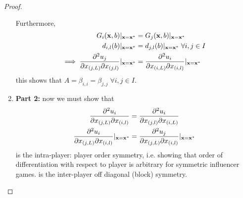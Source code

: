 \documentclass{article}
\begin{document}
\begin{proof}
\begin{enumerate}
                    
                    Furthermore,
                    \begin{align}
                        G_{i}(\mathbf{x},b)|_{\mathbf{x}=\mathbf{x}^*}&=G_{j}(\mathbf{x},b)|_{\mathbf{x}=\mathbf{x}^*}\ \\ %
                        d_{i,l}(b)|_{\mathbf{x}=\mathbf{x}^*}&= d_{j,l}(b)|_{\mathbf{x}=\mathbf{x}^*}\; \forall i,j\in I \\ %
                        \implies \pdv[2]{u_j}{x_{(j,L)}}{x_{(j,l)}}|_{\mathbf{x}=\mathbf{x}^*}&=\pdv[2]{u_i}{x_{(i,L)}}{x_{(i,l)}}|_{\mathbf{x}=\mathbf{x}^*}
                    \end{align}
                    this shows that $A=\beta_{i,i}=\beta_{j,j}\;  \forall i,j\in I$. 
                \item[] \textbf{Part 2:} now we must show that
                    \begin{align}
                        \pdv[2]{u_i}{x_{(j,L)}}{x_{(i,l)}}&=\pdv[2]{u_i}{x_{(j,l)}}{x_{(i,L)}}\label{eq:Jacobian_inter_player_sym} \\ %
                        \pdv[2]{u_i}{x_{(j,L)}}{x_{(i,l)}}|_{\mathbf{x}=\mathbf{x}^*}&=\pdv[2]{u_j}{x_{(j,L)}}{x_{(i,l)}}|_{\mathbf{x}=\mathbf{x}^*}
                        \label{eq_Jacobian_inter_off_sym}
                    \end{align}
                     is the intra-player: player order symmetry, i.e. showing that order of differentiation with respect to player is arbitrary for symmetric influencer games.  is the inter-player off diagonal (block) symmetry. 


\end{enumerate}
\end{proof}
\end{document}
